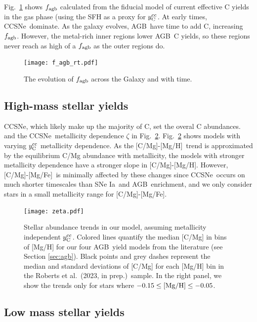 \documentclass[fleqn,usenatbib]{mnras}
\newcommand{\citetjack}{Roberts et al.~(2023, in prep.)}
\newcommand{\agb}{AGB}
\newcommand{\cc}{CCSNe}
\newcommand{\ia}{SNe Ia}
\newcommand{\caah}{[C/Mg]-[Mg/H]}
\newcommand{\caafe}{[C/Mg]-[Mg/Fe]}
\newcommand{\Ycc}{\ensuremath{y_{\rm C}^{\rm cc}}}
\begin{document}
Fig.~\ref{fig:f_agb_evo} shows $f_{\rm agb}$ calculated from the fiducial model of current effective C yields in the gas phase (using the SFH as a proxy for $\Ycc$. 
At early times, \cc\ dominate. As the galaxy evolves, \agb\ have time to add C, increasing $f_{\rm agb}$. However, the metal-rich inner regions lower \agb\ C yields, so these regions never reach as high of a $f_{\rm agb}$ as the outer regions do. 

\begin{figure}
    \centering
    \texttt{[image: f\_agb\_rt.pdf]}
    \caption[]{The evolution of $f_{\rm agb}$ across the Galaxy and with time.}
    \label{fig:f_agb_evo}
\end{figure}


\subsection{High-mass stellar yields}\label{sec:results_highmass}
\cc, which likely make up the majority of C, set the overal C abundances. 
 and the \cc\ metallicity dependence $\zeta$ in Fig.~\ref{fig:first_models}. Fig.~\ref{fig:first_models} shows models with varying $\Ycc$ metallicity dependence. As the \caah~trend is approximated by the equilibrium C/Mg abundance with metallicity, the models with stronger metallicity dependence have a stronger slope in \caah. However, \caafe~is minimally affected by these changes since \cc\ occurs on much shorter timescales than \ia\ and \agb\ enrichment, and we only consider stars in a small metallicity range for \caafe. 


\begin{figure}
\texttt{[image: zeta.pdf]}

\caption[Median Stellar Abundance Trends]{
    Stellar abundance trends in our model, assuming metallicity independent $\Ycc$. Colored lines quantify the median [C/Mg] in bins of [Mg/H] for our four \agb\ yield models from the literature (see Section \ref{sec:agb}). Black points and grey dashes represent the median and standard deviations of [C/Mg] for each [Mg/H] bin in the \citetjack~sample. In the right panel, we show the trends only for stars where $-0.15\leq {\rm [Mg/H]}\leq -0.05$.
}
\label{fig:first_models}
\end{figure}

\subsection{Low mass stellar yields}\label{sec:agb_results}
\end{document}
